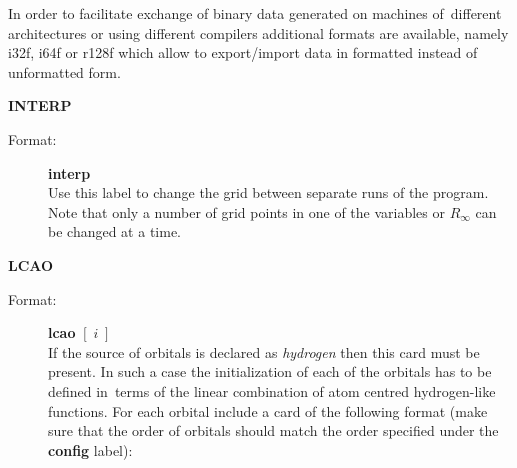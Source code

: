 \documentclass[12pt,a4paper]{article}
\begin{document}
\begin{description}
\begin{description}
  In order to facilitate exchange of binary data generated on machines of~different
  architectures or using different compilers additional formats are available, namely
  i32f, i64f or r128f which allow to export/import data in formatted instead of
  unformatted form.
\end{description} 
                

\item \textbf{INTERP}
\begin{description} 
\item[Format:] \textbf{interp} \\ Use this label to change the grid between separate runs
  of the program.  Note that only a number of grid points in one of the variables or
  $R_{\infty}$ can be changed at a time.
\end{description} 




\item \textbf{LCAO}
\begin{description} 
\item[Format:] \textbf{lcao} $[\;i\;]$\\ If the source of orbitals is declared as
  \textsl{hydrogen} then this card must be present. In such a case the initialization of
  each of the orbitals has to be defined in~terms of the linear combination of atom
  centred hydrogen-like functions. For each orbital include a card of the following format
  (make sure that the order of orbitals should match the order specified under the
  \textbf{config} label):


\end{description}
\end{description}
\end{document}
